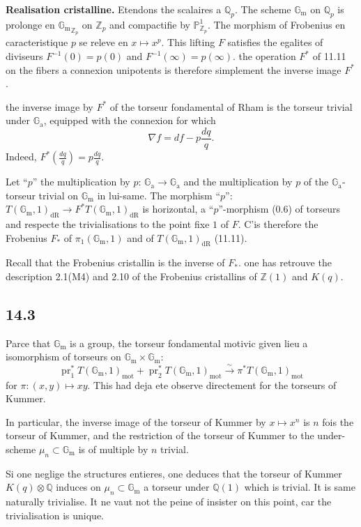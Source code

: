 \documentclass[12pt,a4paper]{article}
\theoremstyle{plain}
\theoremstyle{definition}
\theoremstyle{remark}
\DeclareMathOperator{\pr}{pr}
\newcommand*{\Gm}{\mathbb{G}_\mathrm{m}}
\newcommand{\Ga}{\mathbb{G}_\mathrm{a}}
\newcommand{\bZ}{\mathbb{Z}}
\newcommand{\bQ}{\mathbb{Q}}
\newcommand{\bP}{\mathbb{P}}
\newcommand{\dr}{\mathrm{dR}}
\newcommand{\mot}{\mathrm{mot}}
\begin{document}
\textbf{Realisation cristalline.} Etendons the scalaires a $\bQ_p$. The scheme $\Gm$ on $\bQ_p$ is prolonge en ${\Gm}_{\bZ_p}$ on $\bZ_p$ and compactifie by $\bP^1_{\bZ_p}$. The morphism of Frobenius en caracteristique $p$ se releve en $x \mapsto x^p$. This lifting $F$ satisfies the egalites of diviseurs $F^{-1}(0) = p(0)$ and $F^{-1}(\infty) = p(\infty)$. the operation $F^*$ of 11.11 on the fibers a connexion unipotents is therefore simplement the inverse image $F^*$.

the inverse image by $F^*$ of the torseur fondamental of Rham is the torseur trivial under $\Ga$, equipped with the connexion for which
\[
\nabla f = df - p \frac{dq}{q}.
\]
Indeed, $F^*(\frac{dq}{q}) = p \frac{dq}{q}$.

Let ``$p$'' the multiplication by $p$: $\Ga \to \Ga$ and the multiplication by $p$ of the $\Ga$-torseur trivial on $\Gm$ in lui-same. The morphism ``$p$'': $T(\Gm, 1)_{\dr} \to F^* T(\Gm, 1)_{\dr}$ is horizontal, a ``$p$''-morphism (0.6) of torseurs and respecte the trivialisations to the point fixe $1$ of $F$. C'is therefore the Frobenius $F_*$ of $\pi_1(\Gm, 1)$ and of $T(\Gm, 1)_{\dr}$ (11.11).

Recall that the Frobenius cristallin is the inverse of $F_*$. one has retrouve the description 2.1(M4) and 2.10 of the Frobenius cristallins of $\bZ(1)$ and $K(q)$.

\subsection*{14.3}

Parce that $\Gm$ is a group, the torseur fondamental motivic given lieu a isomorphism of torseurs on $\Gm \times \Gm$:
\[
\pr_1^* T(\Gm, 1)_{\mot} + \pr_2^* T(\Gm, 1)_{\mot} \xrightarrow{\sim} \pi^* T(\Gm, 1)_{\mot}
\]
for $\pi : (x,y) \mapsto xy$. This had deja ete observe directement for the torseurs of Kummer.

In particular, the inverse image of the torseur of Kummer by $x \mapsto x^n$ is $n$ fois the torseur of Kummer, and the restriction of the torseur of Kummer to the under-scheme $\mu_n \subset \Gm$ is of multiple by $n$ trivial.

Si one neglige the structures entieres, one deduces that the torseur of Kummer $K(q) \otimes \bQ$ induces on $\mu_n \subset \Gm$ a torseur under $\bQ(1)$ which is trivial. It is same naturally trivialise. It ne vaut not the peine of insister on this point, car the trivialisation is unique.
\end{document}
